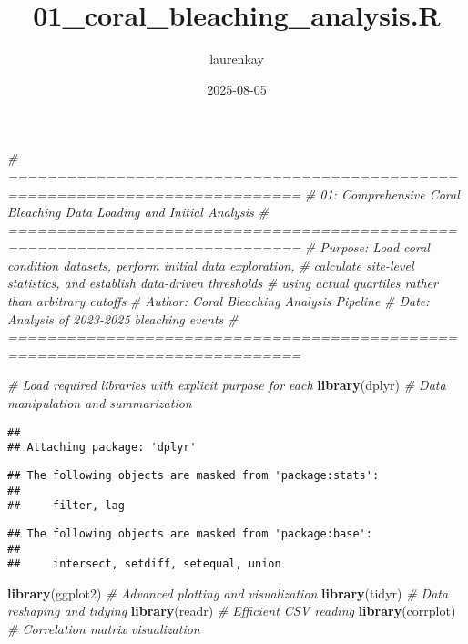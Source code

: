 \documentclass[
]{article}
\title{01\_coral\_bleaching\_analysis.R}
\author{laurenkay}
\date{2025-08-05}
\newenvironment{Shaded}{\begin{snugshade}}{\end{snugshade}}
\newcommand{\CommentTok}[1]{\textcolor[rgb]{0.56,0.35,0.01}{\textit{#1}}}
\newcommand{\FunctionTok}[1]{\textcolor[rgb]{0.13,0.29,0.53}{\textbf{#1}}}
\newcommand{\NormalTok}[1]{#1}
\begin{document}
\maketitle

\begin{Shaded}
\begin{Highlighting}[]
\CommentTok{\# ============================================================================}
\CommentTok{\# 01: Comprehensive Coral Bleaching Data Loading and Initial Analysis}
\CommentTok{\# ============================================================================}
\CommentTok{\# Purpose: Load coral condition datasets, perform initial data exploration,}
\CommentTok{\#          calculate site{-}level statistics, and establish data{-}driven thresholds}
\CommentTok{\#          using actual quartiles rather than arbitrary cutoffs}
\CommentTok{\# Author: Coral Bleaching Analysis Pipeline}
\CommentTok{\# Date: Analysis of 2023{-}2025 bleaching events}
\CommentTok{\# ============================================================================}

\CommentTok{\# Load required libraries with explicit purpose for each}
\FunctionTok{library}\NormalTok{(dplyr)        }\CommentTok{\# Data manipulation and summarization}
\end{Highlighting}
\end{Shaded}

\begin{verbatim}
## 
## Attaching package: 'dplyr'
\end{verbatim}

\begin{verbatim}
## The following objects are masked from 'package:stats':
## 
##     filter, lag
\end{verbatim}

\begin{verbatim}
## The following objects are masked from 'package:base':
## 
##     intersect, setdiff, setequal, union
\end{verbatim}

\begin{Shaded}
\begin{Highlighting}[]
\FunctionTok{library}\NormalTok{(ggplot2)      }\CommentTok{\# Advanced plotting and visualization}
\FunctionTok{library}\NormalTok{(tidyr)        }\CommentTok{\# Data reshaping and tidying}
\FunctionTok{library}\NormalTok{(readr)        }\CommentTok{\# Efficient CSV reading}
\FunctionTok{library}\NormalTok{(corrplot)     }\CommentTok{\# Correlation matrix visualization}
\end{Highlighting}
\end{Shaded}
\end{document}

